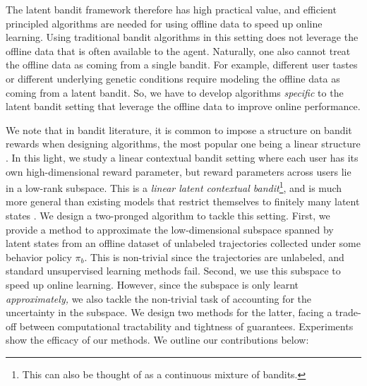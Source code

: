  
The latent bandit framework therefore has high practical value, and efficient principled algorithms are needed for using offline data to speed up online learning. Using traditional bandit algorithms in this setting does not leverage the offline data that is often available to the agent. Naturally, one also cannot treat the offline data as coming from a single bandit. For example, different user tastes or different underlying genetic conditions require modeling the offline data as coming from a latent bandit. So, we have to develop algorithms \textit{specific} to the latent bandit setting that leverage the offline data to improve online performance. 

 
We note that in bandit literature, it is common to impose a structure on bandit rewards when designing algorithms, the most popular one being a linear structure \citep{Li_2010, abbasi2011improved}. In this light, we study a linear contextual bandit setting where each user has its own high-dimensional reward parameter, but reward parameters across users lie in a low-rank subspace. This is a \textit{linear latent contextual bandit}\footnote{This can also be thought of as a continuous mixture of bandits.}, and is much more general than existing models that restrict themselves to finitely many latent states \citep{hong2020latent, hong2022thompsonsamplingmixtureprior}. We design a two-pronged algorithm to tackle this setting. First, we provide a method to approximate the low-dimensional subspace spanned by latent states from an offline dataset of unlabeled trajectories collected under some behavior policy $\pi_b$. This is non-trivial since the trajectories are unlabeled, and standard unsupervised learning methods fail. Second, we use this subspace to speed up online learning. However, since the subspace is only learnt \textit{approximately,} we also tackle the non-trivial task of accounting for the uncertainty in the subspace. We design two methods for the latter, facing a trade-off between computational tractability and tightness of guarantees. Experiments show the efficacy of our methods. We outline our contributions below:
 
